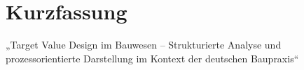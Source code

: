 \cleardoublepage
{}
{} %
\chapter*{Kurzfassung}

„Target Value Design im Bauwesen – Strukturierte Analyse und prozessorientierte Darstellung im Kontext der deutschen Baupraxis“